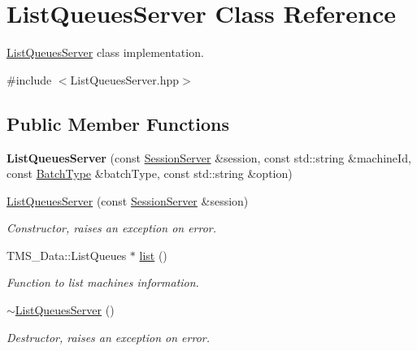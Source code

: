 \hypertarget{classListQueuesServer}{
\section{ListQueuesServer Class Reference}
\label{classListQueuesServer}
}


\hyperlink{classListQueuesServer}{ListQueuesServer} class implementation.  




{\ttfamily \#include $<$ListQueuesServer.hpp$>$}

\subsection*{Public Member Functions}
\begin{DoxyCompactItemize}
\item 
\hypertarget{classListQueuesServer_a6d4d04d78890a204b0cf04e3e9050e20}{
{\bfseries ListQueuesServer} (const \hyperlink{classSessionServer}{SessionServer} \&session, const std::string \&machineId, const \hyperlink{utilVishnu_8hpp_a864d748e7097d176552dd4c7635016ea}{BatchType} \&batchType, const std::string \&option)}
\label{classListQueuesServer_a6d4d04d78890a204b0cf04e3e9050e20}

\item 
\hyperlink{classListQueuesServer_ae5b2ded488fba8e7d7058ffb8cb9a59f}{ListQueuesServer} (const \hyperlink{classSessionServer}{SessionServer} \&session)
\begin{DoxyCompactList}\small\item\em Constructor, raises an exception on error. \item\end{DoxyCompactList}\item 
TMS\_\-Data::ListQueues $\ast$ \hyperlink{classListQueuesServer_a7cc2af173f4af9b01be963bf064fc406}{list} ()
\begin{DoxyCompactList}\small\item\em Function to list machines information. \item\end{DoxyCompactList}\item 
\hypertarget{classListQueuesServer_a8fa3170eef996df2357476355c2d2c52}{
\hyperlink{classListQueuesServer_a8fa3170eef996df2357476355c2d2c52}{$\sim$ListQueuesServer} ()}
\label{classListQueuesServer_a8fa3170eef996df2357476355c2d2c52}

\begin{DoxyCompactList}\small\item\em Destructor, raises an exception on error. \item\end{DoxyCompactList}\end{DoxyCompactItemize}
